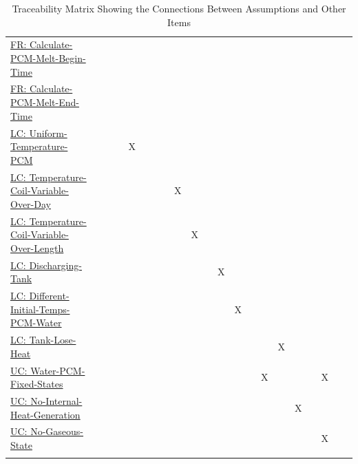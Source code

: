 \documentclass[12pt]{article}
\begin{document}
\begin{longtable}{l l l l l l l l l l l l l l l l l l l l l}
\\
\hyperref[calcPCMMeltBegin]{FR: Calculate-PCM-Melt-Begin-Time} &  &  &  &  &  &  &  &  &  &  &  &  &  &  &  &  &  &  &  & 
\\
\hyperref[calcPCMMeltEnd]{FR: Calculate-PCM-Melt-End-Time} &  &  &  &  &  &  &  &  &  &  &  &  &  &  &  &  &  &  &  & 
\\
\hyperref[likeChgUTP]{LC: Uniform-Temperature-PCM} &  &  &  & X &  &  &  &  &  &  &  &  &  &  &  &  &  &  &  & 
\\
\hyperref[likeChgTCVOD]{LC: Temperature-Coil-Variable-Over-Day} &  &  &  &  &  &  &  & X &  &  &  &  &  &  &  &  &  &  &  & 
\\
\hyperref[likeChgTCVOL]{LC: Temperature-Coil-Variable-Over-Length} &  &  &  &  &  &  &  &  & X &  &  &  &  &  &  &  &  &  &  & 
\\
\hyperref[likeChgDT]{LC: Discharging-Tank} &  &  &  &  &  &  &  &  &  &  & X &  &  &  &  &  &  &  &  & 
\\
\hyperref[likeChgDITPW]{LC: Different-Initial-Temps-PCM-Water} &  &  &  &  &  &  &  &  &  &  &  & X &  &  &  &  &  &  &  & 
\\
\hyperref[likeChgTLH]{LC: Tank-Lose-Heat} &  &  &  &  &  &  &  &  &  &  &  &  &  &  & X &  &  &  &  & 
\\
\hyperref[unlikeChgWPFS]{UC: Water-PCM-Fixed-States} &  &  &  &  &  &  &  &  &  &  &  &  &  & X &  &  &  & X &  & 
\\
\hyperref[unlikeChgNIHG]{UC: No-Internal-Heat-Generation} &  &  &  &  &  &  &  &  &  &  &  &  &  &  &  & X &  &  &  & 
\\
\hyperref[unlikeChgNGS]{UC: No-Gaseous-State} &  &  &  &  &  &  &  &  &  &  &  &  &  &  &  &  &  & X &  & 
\\
\bottomrule
\caption{Traceability Matrix Showing the Connections Between Assumptions and Other Items}
\label{Table:TraceMatAvsAll}
\end{longtable}
\end{document}
